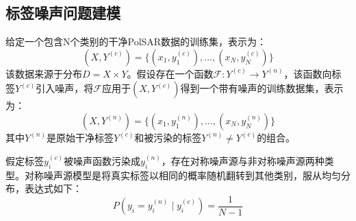 \subsection{标签噪声问题建模}
给定一个包含N个类别的干净PolSAR数据的训练集，表示为：
\begin{equation}
    (X, Y^{(c)})=\{(x_1,y_1^{(c)}),\ldots,(x_N,y_N^{(c)})\}
\end{equation}
该数据来源于分布$D=X \times Y$。假设存在一个函数$\mathcal{F}:Y^{(c)} \rightarrow Y^{(n)}$，该函数向标签$Y^{(c)}$引入噪声，将$\mathcal{F}$应用于$(X, Y^{(c)})$得到一个带有噪声的训练数据集，表示为：
\begin{equation}
    (X, Y^{(n)})=\{(x_1,y_1^{(n)}),\ldots,(x_N,y_N^{(n)})\}
\end{equation}
其中$Y^{(n)}$是原始干净标签$Y^{(c)}$和被污染的标签$Y^{(n)} \neq Y^{(c)}$的组合。

假定标签$y_i^{(c)}$被噪声函数污染成$y_i^{(n)}$，存在对称噪声源与非对称噪声源两种类型。对称噪声源模型是将真实标签以相同的概率随机翻转到其他类别，服从均匀分布，表达式如下：
\begin{equation}
    P(y_i=y_i^{(n)} \mid y_i^{(c)})=\frac{1}{N-1}
\end{equation}


